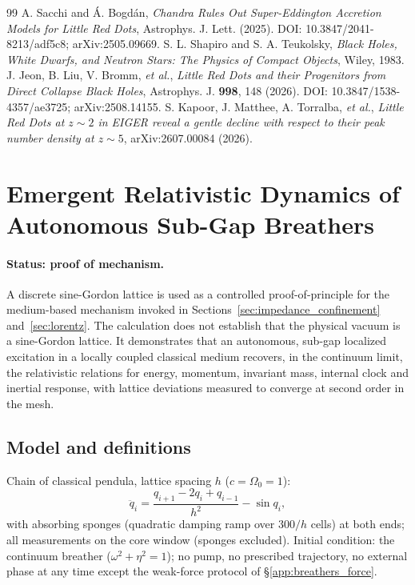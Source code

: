\documentclass[11pt,a4paper]{article}
\theoremstyle{plain}
\theoremstyle{remark}
\begin{document}
\begin{thebibliography}{99}
 A. Sacchi and \'A. Bogd\'an, \emph{Chandra Rules Out Super-Eddington Accretion Models for Little Red Dots}, Astrophys. J. Lett. (2025). DOI: 10.3847/2041-8213/adf5c8; arXiv:2505.09669.
 S. L. Shapiro and S. A. Teukolsky, \textit{Black Holes, White Dwarfs, and Neutron Stars: The Physics of Compact Objects}, Wiley, 1983.
 J. Jeon, B. Liu, V. Bromm, \emph{et al.}, \emph{Little Red Dots and their Progenitors from Direct Collapse Black Holes}, Astrophys. J. \textbf{998}, 148 (2026). DOI: 10.3847/1538-4357/ae3725; arXiv:2508.14155.
 S. Kapoor, J. Matthee, A. Torralba, \emph{et al.}, \emph{Little Red Dots at $z\sim2$ in EIGER reveal a gentle decline with respect to their peak number density at $z\sim5$}, arXiv:2607.00084 (2026).
\end{thebibliography}


\section{Emergent Relativistic Dynamics of Autonomous Sub-Gap Breathers}
\label{app:breathers}

\paragraph{Status: proof of mechanism.} A discrete sine-Gordon lattice is used as a controlled proof-of-principle for the medium-based mechanism invoked in Sections~\ref{sec:impedance_confinement} and~\ref{sec:lorentz}. The calculation does not establish that the physical vacuum is a sine-Gordon lattice. It demonstrates that an autonomous, sub-gap localized excitation in a locally coupled classical medium recovers, in the continuum limit, the relativistic relations for energy, momentum, invariant mass, internal clock and inertial response, with lattice deviations measured to converge at second order in the mesh.

\subsection{Model and definitions}
Chain of classical pendula, lattice spacing $h$ ($c = \Omega_0 = 1$):
\begin{equation}\label{eq:sg_lattice}
\ddot q_i = \frac{q_{i+1} - 2q_i + q_{i-1}}{h^2} - \sin q_i,
\end{equation}
with absorbing sponges (quadratic damping ramp over $300/h$ cells) at both ends; all measurements on the core window (sponges excluded). Initial condition: the continuum breather ($\omega^2 + \eta^2 = 1$); no pump, no prescribed trajectory, no external phase at any time except the weak-force protocol of \S\ref{app:breathers_force}.
\end{document}
